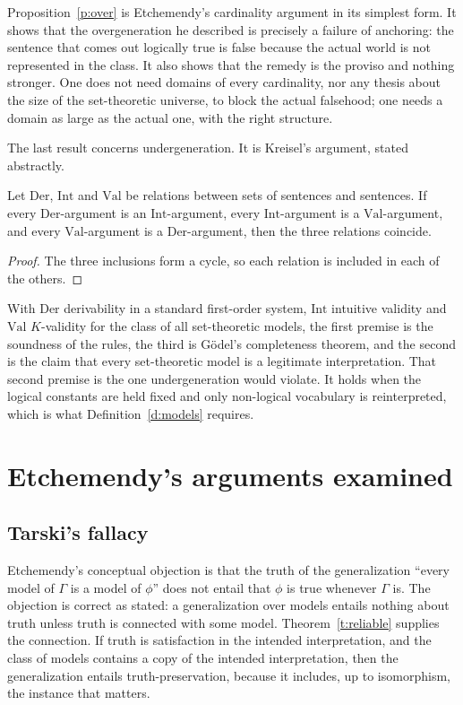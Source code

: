 \documentclass{situationist-preprint}
\begin{document}
Proposition~\ref{p:over} is Etchemendy's cardinality argument in its simplest form. It shows that the overgeneration he described is precisely a failure of anchoring: the sentence that comes out logically true is false because the actual world is not represented in the class. It also shows that the remedy is the proviso and nothing stronger. One does not need domains of every cardinality, nor any thesis about the size of the set-theoretic universe, to block the actual falsehood; one needs a domain as large as the actual one, with the right structure.

The last result concerns undergeneration. It is Kreisel's argument, stated abstractly.

\begin{theorem}\label{t:squeeze}
Let $\mathrm{Der}$, $\mathrm{Int}$ and $\mathrm{Val}$ be relations between sets of sentences and sentences. If every $\mathrm{Der}$-argument is an $\mathrm{Int}$-argument, every $\mathrm{Int}$-argument is a $\mathrm{Val}$-argument, and every $\mathrm{Val}$-argument is a $\mathrm{Der}$-argument, then the three relations coincide.
\end{theorem}

\begin{proof}
The three inclusions form a cycle, so each relation is included in each of the others.
\end{proof}

With $\mathrm{Der}$ derivability in a standard first-order system, $\mathrm{Int}$ intuitive validity and $\mathrm{Val}$ $K$-validity for the class of all set-theoretic models, the first premise is the soundness of the rules, the third is G\"odel's completeness theorem, and the second is the claim that every set-theoretic model is a legitimate interpretation. That second premise is the one undergeneration would violate. It holds when the logical constants are held fixed and only non-logical vocabulary is reinterpreted, which is what Definition~\ref{d:models} requires.

\section{Etchemendy's arguments examined}\label{s:etch}

\subsection{Tarski's fallacy}

Etchemendy's conceptual objection is that the truth of the generalization \enquote{every model of $\Gamma$ is a model of $\phi$} does not entail that $\phi$ is true whenever $\Gamma$ is. The objection is correct as stated: a generalization over models entails nothing about truth unless truth is connected with some model. Theorem~\ref{t:reliable} supplies the connection. If truth is satisfaction in the intended interpretation, and the class of models contains a copy of the intended interpretation, then the generalization entails truth-preservation, because it includes, up to isomorphism, the instance that matters.
\end{document}
